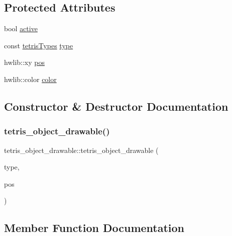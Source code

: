 \subsection*{Protected Attributes}
\begin{DoxyCompactItemize}
\item 
bool \hyperlink{classtetris__object__drawable_a0fdc6508c80ce9084eeb95e2c90eb598}{active}
\item 
const \hyperlink{enums_8hpp_aa2b983d3f5fee7f17796e5ef5040d787}{tetris\+Types} \hyperlink{classtetris__object__drawable_a340ea25384078c922b226a9edd5a7eba}{type}
\item 
hwlib\+::xy \hyperlink{classtetris__object__drawable_ae4cdab0c98e79aff3d200b9bca0cee2a}{pos}
\item 
hwlib\+::color \hyperlink{classtetris__object__drawable_acadb3c4b01c21a02c89125fc8931aa27}{color}
\end{DoxyCompactItemize}


\subsection{Constructor \& Destructor Documentation}
\mbox{\label{classtetris__object__drawable_a4a9edbb5b747f9b7b3732547b66a89d7}} 
\subsubsection{\texorpdfstring{tetris\+\_\+object\+\_\+drawable()}{tetris\_object\_drawable()}}
{\footnotesize\ttfamily tetris\+\_\+object\+\_\+drawable\+::tetris\+\_\+object\+\_\+drawable (\begin{DoxyParamCaption}\item[{\hyperlink{enums_8hpp_aa2b983d3f5fee7f17796e5ef5040d787}{tetris\+Types}}]{type,  }\item[{hwlib\+::xy}]{pos }\end{DoxyParamCaption})\hspace{0.3cm}{\ttfamily [inline]}}



\subsection{Member Function Documentation}
\mbox{\label{classtetris__object__drawable_a41be74f61608223f562f7082825919a0}} 
